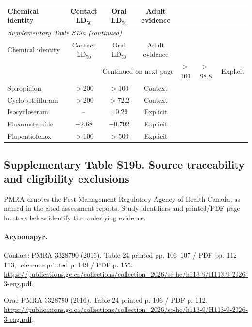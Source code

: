 \begin{longtable}{lccc}

\toprule Chemical identity & Contact LD$_{50}$ & Oral LD$_{50}$ & Adult evidence \\ \midrule\endfirsthead

\multicolumn{4}{l}{\textit{Supplementary Table S19a (continued)}} \\

\toprule Chemical identity & Contact LD$_{50}$ & Oral LD$_{50}$ & Adult evidence \\ \midrule\endhead

\midrule\multicolumn{4}{r}{Continued on next page}\endfoot\bottomrule\endlastfoot

Acynonapyr & $>$100 & $>$98.8 & Explicit \\
Spiropidion & $>$200 & $>$100 & Context \\
Cyclobutrifluram & $>$200 & $>$72.2 & Context \\
Isocycloseram & -- & =0.29 & Explicit \\
Fluxametamide & =2.68 & =0.792 & Explicit \\
Flupentiofenox & $>$100 & $>$500 & Explicit \\

\end{longtable}\endgroup

\subsection*{Supplementary Table S19b. Source traceability and eligibility exclusions}

PMRA denotes the Pest Management Regulatory Agency of Health Canada, as named in the cited assessment reports. Study identifiers and printed/PDF page locators below identify the underlying evidence.

\paragraph{Acynonapyr.}

Contact: PMRA 3328790 (2016). Table 24 printed pp. 106--107 / PDF pp. 112--113; reference printed p. 149 / PDF p. 155. \url{https://publications.gc.ca/collections/collection_2026/sc-hc/h113-9/H113-9-2026-3-eng.pdf}.

Oral: PMRA 3328790 (2016). Table 24 printed p. 106 / PDF p. 112. \url{https://publications.gc.ca/collections/collection_2026/sc-hc/h113-9/H113-9-2026-3-eng.pdf}.

